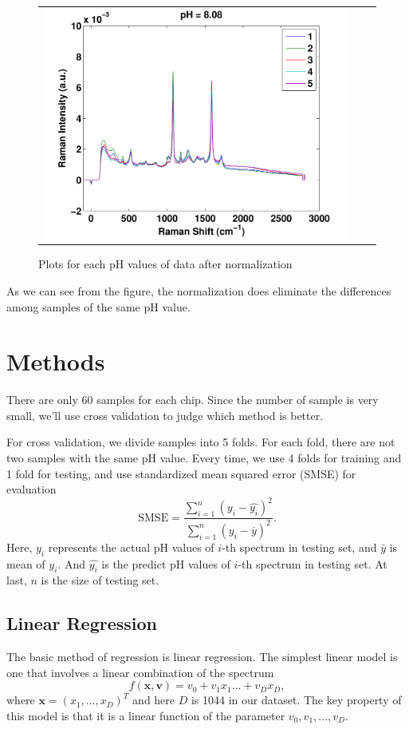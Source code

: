 \documentclass[a4paper]{article}
\newcommand{\bfv}{\mathbf{v}}
\newcommand{\bfx}{\mathbf{x}}
\begin{document}
\begin{figure}[h]
\begin{tabular}{ccc}
\includegraphics[width=.33\textwidth]{images/n12.pdf} \\
\end{tabular}
\caption{Plots for each pH values of data after normalization}\label{pic3}
\end{figure}

As we can see from the figure, the normalization does eliminate the differences among samples of the same pH value.
\section{Methods}
There are only 60 samples for each chip. Since the number of sample is very small, we'll use cross validation to judge which method is better.

For cross validation, we divide samples into 5 folds. For each fold, there are not two samples with the same pH value. Every time, we use 4 folds for training and 1 fold for testing, and use standardized mean squared error (SMSE) for evaluation%
\begin{equation}
\mathrm{SMSE}=\frac{\displaystyle \sum_{i=1}^n (y_i-\hat{y_i})^2}{\displaystyle \sum_{i=1}^n (y_i-\overline{y})^2}.
\end{equation}
Here, $y_i$ represents the actual pH values of $i$-th spectrum in testing set, and $\bar{y}$ is mean of $y_i$. And $\hat{y_i}$ is the predict pH values of $i$-th spectrum in testing set. At last, $n$ is the size of testing set.
\subsection{Linear Regression}
The basic method of regression is linear regression. The simplest linear model is one that involves a linear combination of the spectrum
\begin{equation}
f(\bfx,\bfv)=v_0+v_1x_1\ldots+v_Dx_D,
\end{equation}
where $\bfx=(x_1,\ldots,x_D)^T$ and here $D$ is 1044 in our dataset. The key property of this model is that it is a linear function of the parameter $v_0,v_1,\ldots,v_D$. 
\end{document}
